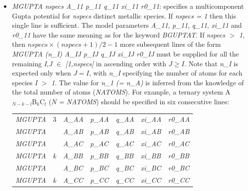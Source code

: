 \documentclass[12pt,a4paper,dvips]{article}
\begin{document}
\begin{itemize}
\item {\it MGUPTA nspecs A\_11 p\_11 q\_11 xi\_11 r0\_11\/}: specifies a multicomponent Gupta potential for {\it nspecs} distinct metallic species. If {\it nspecs = 1\/} then this single line is sufficient. The model parameters {\it A\_11\/}, {\it p\_11\/}, {\it q\_11\/}, {\it xi\_11\/} and {\it r0\_11\/} have the same meaning as for the keyword {\it BGUPTAT\/}. If {\it nspecs $>$ 1\/}, then $ nspecs \times (nspecs + 1)/2 - 1$ more subsequent lines of the form {\it MGUPTA (n\_I) A\_IJ p\_IJ q\_IJ xi\_IJ r0\_IJ \/} must be supplied for all the remaining {\it I,J $\in$ [1,nspecs] \/} in ascending order with $J \geq I$. Note that {\it n\_I\/} is expected only when $J = I$, with {\it n\_I\/} specifying the number of atoms for each species {\it I $>$ 1\/}. The value for {\it n\_1 (= n\_A)\/} is inferred from the knowledge of the total number of atoms ({\it NATOMS\/}). For example, a ternary system A$_{N-k-l}$B$_{k}$C$_{l}$  ({\it N = NATOMS\/}) should be specified in six consecutive lines: \\
\begin{tabular}{lllllll}
{\it MGUPTA} & 3 & {\it A\_AA} & {\it p\_AA} & {\it q\_AA} & {\it xi\_AA} & {\it r0\_AA} \\
{\it MGUPTA} &   & {\it A\_AB} & {\it p\_AB} & {\it q\_AB} & {\it xi\_AB} & {\it r0\_AB} \\
{\it MGUPTA} &   & {\it A\_AC} & {\it p\_AC} & {\it q\_AC} & {\it xi\_AC} & {\it r0\_AC} \\
{\it MGUPTA} & {\it k} & {\it A\_BB} & {\it p\_BB} & {\it q\_BB} & {\it xi\_BB} & {\it r0\_BB} \\
{\it MGUPTA} &   & {\it A\_BC} & {\it p\_BC} & {\it q\_BC} & {\it xi\_BC} & {\it r0\_BC} \\
{\it MGUPTA} & {\it k} & {\it A\_CC} & {\it p\_CC} & {\it q\_CC} & {\it xi\_CC} & {\it r0\_CC} \\
\end{tabular}


\end{itemize}
\end{document}
